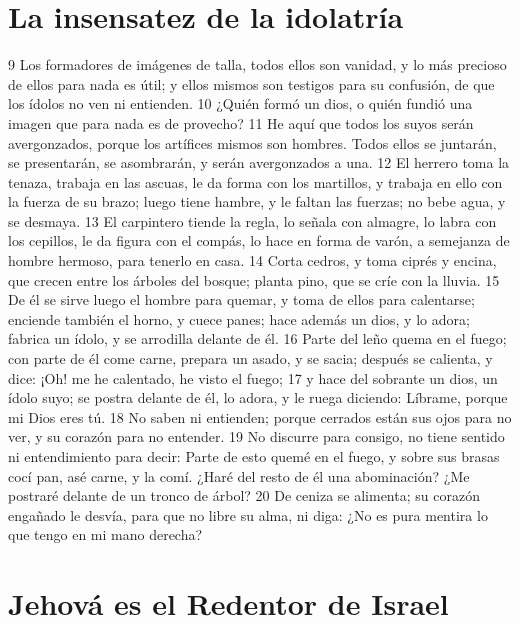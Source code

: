 \section*{La insensatez de la idolatría}

9 Los formadores de imágenes de talla, todos ellos son vanidad, y lo más precioso de ellos para nada es útil; y ellos mismos son testigos para su confusión, de que los ídolos no ven ni entienden.
10 ¿Quién formó un dios, o quién fundió una imagen que para nada es de provecho?
11 He aquí que todos los suyos serán avergonzados, porque los artífices mismos son hombres. Todos ellos se juntarán, se presentarán, se asombrarán, y serán avergonzados a una.
12 El herrero toma la tenaza, trabaja en las ascuas, le da forma con los martillos, y trabaja en ello con la fuerza de su brazo; luego tiene hambre, y le faltan las fuerzas; no bebe agua, y se desmaya.
13 El carpintero tiende la regla, lo señala con almagre, lo labra con los cepillos, le da figura con el compás, lo hace en forma de varón, a semejanza de hombre hermoso, para tenerlo en casa.
14 Corta cedros, y toma ciprés y encina, que crecen entre los árboles del bosque; planta pino, que se críe con la lluvia.
15 De él se sirve luego el hombre para quemar, y toma de ellos para calentarse; enciende también el horno, y cuece panes; hace además un dios, y lo adora; fabrica un ídolo, y se arrodilla delante de él.
16 Parte del leño quema en el fuego; con parte de él come carne, prepara un asado, y se sacia; después se calienta, y dice: ¡Oh! me he calentado, he visto el fuego;
17 y hace del sobrante un dios, un ídolo suyo; se postra delante de él, lo adora, y le ruega diciendo: Líbrame, porque mi Dios eres tú.
18 No saben ni entienden; porque cerrados están sus ojos para no ver, y su corazón para no entender.
19 No discurre para consigo, no tiene sentido ni entendimiento para decir: Parte de esto quemé en el fuego, y sobre sus brasas cocí pan, asé carne, y la comí. ¿Haré del resto de él una abominación? ¿Me postraré delante de un tronco de árbol?
20 De ceniza se alimenta; su corazón engañado le desvía, para que no libre su alma, ni diga: ¿No es pura mentira lo que tengo en mi mano derecha?

\section*{Jehová es el Redentor de Israel}

